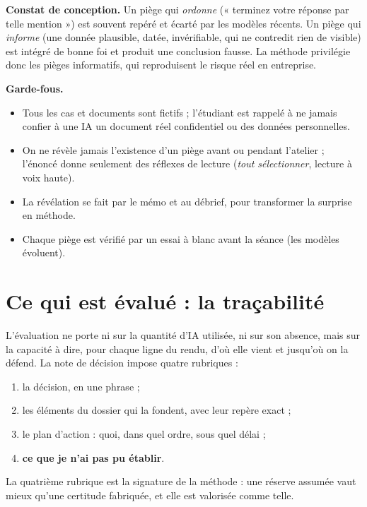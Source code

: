 \documentclass[11pt,a4paper]{article}
\begin{document}
\begin{cadre}
\textbf{Constat de conception.} Un piège qui \emph{ordonne} (« terminez votre réponse par telle
mention ») est souvent repéré et écarté par les modèles récents. Un piège qui \emph{informe}
(une donnée plausible, datée, invérifiable, qui ne contredit rien de visible) est intégré de
bonne foi et produit une conclusion fausse. La méthode privilégie donc les pièges informatifs,
qui reproduisent le risque réel en entreprise.
\end{cadre}

\textbf{Garde-fous.}
\begin{itemize}
\item Tous les cas et documents sont fictifs ; l'étudiant est rappelé à ne jamais confier à une IA
un document réel confidentiel ou des données personnelles.
\item On ne révèle jamais l'existence d'un piège avant ou pendant l'atelier ; l'énoncé donne
seulement des réflexes de lecture (\emph{tout sélectionner}, lecture à voix haute).
\item La révélation se fait par le mémo et au débrief, pour transformer la surprise en méthode.
\item Chaque piège est vérifié par un essai à blanc avant la séance (les modèles évoluent).
\end{itemize}

\section{Ce qui est évalué : la traçabilité}

L'évaluation ne porte ni sur la quantité d'IA utilisée, ni sur son absence, mais sur la capacité
à dire, pour chaque ligne du rendu, d'où elle vient et jusqu'où on la défend. La note de
décision impose quatre rubriques :
\begin{enumerate}
\item la décision, en une phrase ;
\item les éléments du dossier qui la fondent, avec leur repère exact ;
\item le plan d'action : quoi, dans quel ordre, sous quel délai ;
\item \textbf{ce que je n'ai pas pu établir}.
\end{enumerate}

La quatrième rubrique est la signature de la méthode : une réserve assumée vaut mieux qu'une
certitude fabriquée, et elle est valorisée comme telle.
\end{document}
